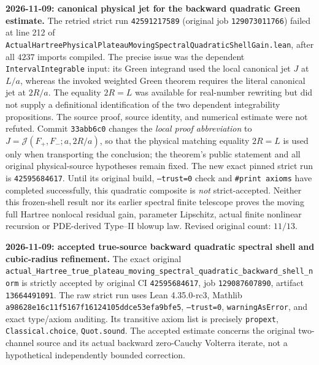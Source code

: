 \documentclass[11pt]{amsart}
\begin{document}
\medskip
\noindent\textbf{2026-11-09: canonical physical jet for the backward quadratic Green estimate.}
The retried strict run \texttt{42591217589} (original job
\texttt{129073011766}) failed at line 212 of
\texttt{ActualHartreePhysicalPlateauMovingSpectralQuadraticShellGain.lean},
after all $4237$ imports compiled. The precise issue was the dependent
\texttt{IntervalIntegrable} input: its Green integrand used the local
canonical jet $J$ at $L/a$, whereas the invoked weighted Green theorem
requires the literal canonical jet at $2R/a$. The equality $2R=L$ was
available for real-number rewriting but did not supply a definitional
identification of the two dependent integrability propositions.
The source proof, source identity, and numerical estimate were not refuted.
Commit \texttt{33abb6c0} changes the \emph{local proof abbreviation} to
$J=\mathcal J(F_+,F_-;a,2R/a)$, so that the physical matching equality
$2R=L$ is used only when transporting the conclusion; the theorem's
public statement and all original physical-source hypotheses remain fixed.
The new exact pinned strict run is \texttt{42595684617}.
Until its original build, \texttt{--trust=0} check and
\texttt{\#print axioms} have completed successfully,
this quadratic composite is \emph{not} strict-accepted.
Neither this frozen-shell result nor its earlier spectral finite
telescope proves the moving full Hartree nonlocal residual gain,
parameter Lipschitz, actual finite nonlinear recursion or
PDE-derived Type--II blowup law. Revised original count: $11/13$.


\medskip
\noindent\textbf{2026-11-09: accepted true-source backward quadratic spectral shell and cubic-radius refinement.}
The exact original
\texttt{actual\_Hartree\_true\_plateau\_moving\_spectral\_quadratic\_backward\_shell\_norm}
is strictly accepted by original CI \texttt{42595684617},
job \texttt{129087607890}, artifact \texttt{13664491091}.
The raw strict run uses Lean 4.35.0-rc3, Mathlib
\texttt{a98628e16c11f5167f16124105ddce53efa9bfe5},
\texttt{--trust=0}, \texttt{warningAsError}, and exact type/axiom auditing.
Its transitive axiom list is precisely
\texttt{propext}, \texttt{Classical.choice}, \texttt{Quot.sound}.
The accepted estimate concerns the original two-channel source and
its actual backward zero-Cauchy Volterra iterate, not a hypothetical
independently bounded correction.
\end{document}
